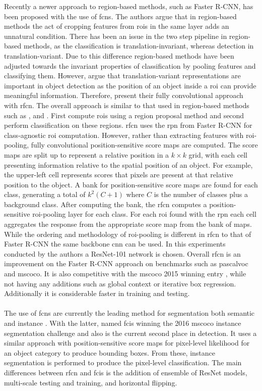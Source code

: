 Recently a newer approach to region-based methods, such as Faster R-CNN, has been proposed with the use of \glspl{fcn}. The authors argue that in region-based methods the act of cropping features from \glspl{roi} in the same layer adds an unnatural condition. There has been an issue in the two step pipeline in region-based methods, as the classification is translation-invariant, whereas detection in translation-variant. Due to this difference region-based methods have been adjusted towards the invariant properties of classification by pooling features and classifying them. However, \cite{rfcn} argue that translation-variant representations are important in object detection as the position of an object inside a \gls{roi} can provide meaningful information. Therefore, \cite{rfcn} present their fully convolutional approach with \gls{rfcn}. The overall approach is similar to that used in region-based methods such as \cite{rcnn}, \cite{fastrcnn} and \cite{fasterrcnn}. First compute \glspl{roi} using a region proposal method and second perform classification on these regions. \gls{rfcn} uses the \gls{rpn} from Faster R-CNN \cite{fasterrcnn} for class-agnostic \gls{roi} computation. However, rather than extracting features with \gls{roi}-pooling, fully convolutional position-sensitive score maps are computed. The score maps are split up to represent a relative position in a $k\times k$ grid, with each cell presenting information relative to the spatial position of an object. For example, the upper-left cell represents scores that pixels are present at that relative position to the object. A bank for position-sensitive score maps are found for each class, generating a total of $k^2(C+1)$ where $C$ is the number of classes plus a background class. After computing the bank, the \gls{rfcn} computes a position-sensitive \gls{roi}-pooling layer for each class. For each \gls{roi} found with the \gls{rpn} each cell aggregates the response from the appropriate score map from the bank of maps. While the ordering and methodology of \gls{roi}-pooling is different in \gls{rfcn} to that of Faster R-CNN the same backbone \gls{cnn} can be used. In this experiments conducted by the authors a ResNet-101 network is chosen. Overall \gls{rfcn} is an improvement on the Faster R-CNN approach on benchmarks such as \gls{pascalvoc} and \gls{mscoco}. It is also competitive with the \gls{mscoco} 2015 winning entry \cite{deepres}, while not having any additions such as global context or iterative box regression. Additionally it is considerable faster in training and testing. 
\\\\
The use of \glspl{fcn} are currently the leading method for segmentation both semantic \cite{semfcn} and instance \cite{instancefcn}. With the latter, named \gls{fcis} winning the 2016 \gls{mscoco} instance segmentation challenge and also is the current second place in detection. It uses a similar approach with position-sensitive score maps for pixel-level likelihood for an object category to produce bounding boxes. From these, instance segmentation is performed to produce the pixel-level classification. The main differences between \gls{rfcn} and \gls{fcis} is the addition of ensemble of ResNet models, multi-scale testing and training, and horizontal flipping.